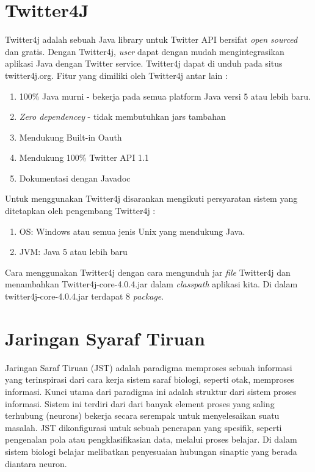 \section{Twitter4J}
Twitter4j adalah sebuah Java library untuk Twitter API bersifat \textit{open sourced} dan gratis. Dengan Twitter4j, \textit{user} dapat dengan mudah mengintegrasikan aplikasi Java dengan Twitter service. Twitter4j dapat di unduh pada situs twitter4j.org. Fitur yang dimiliki oleh Twitter4j antar lain :
\begin{enumerate}
	\item 100\% Java murni - bekerja pada semua platform Java versi 5 atau lebih baru.
	\item \textit{Zero dependencey} - tidak membutuhkan jars tambahan
	\item Mendukung Built-in Oauth
	\item Mendukung 100\% Twitter API 1.1
	\item Dokumentasi dengan Javadoc
\end{enumerate}
Untuk menggunakan Twitter4j disarankan mengikuti persyaratan sistem yang ditetapkan oleh pengembang Twitter4j :
\begin{enumerate}
	\item OS: Windows atau semua jenis Unix yang mendukung Java.
	\item JVM: Java 5 atau lebih baru
\end{enumerate}
Cara menggunakan Twitter4j dengan cara mengunduh jar \textit{file} Twitter4j dan menambahkan Twitter4j-core-4.0.4.jar dalam \textit{classpath} aplikasi kita. Di dalam twitter4j-core-4.0.4.jar terdapat 8 \textit{package}.
\section{Jaringan Syaraf Tiruan}
Jaringan Saraf Tiruan (JST) adalah paradigma memproses sebuah informasi yang terinspirasi dari cara kerja sistem saraf biologi, seperti otak, memproses informasi. Kunci utama dari paradigma ini adalah struktur dari sistem proses informasi. Sistem ini terdiri dari dari banyak element proses yang saling terhubung (neurons) bekerja secara serempak untuk menyelesaikan suatu masalah.  JST dikonfigurasi untuk sebuah penerapan yang spesifik, seperti  pengenalan pola atau pengklasifikasian data, melalui proses belajar. Di dalam sistem biologi belajar melibatkan penyesuaian hubungan sinaptic yang berada diantara neuron.\\\\
